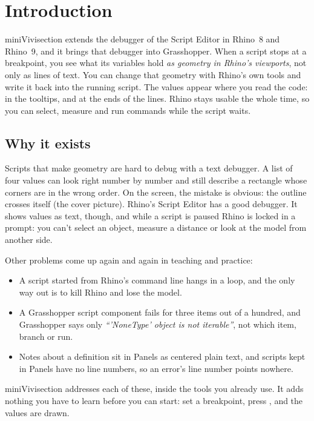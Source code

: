 \chapter{Introduction}\label{ch:intro}

miniVivisection extends the debugger of the Script Editor in Rhino~8 and Rhino~9, and it brings that debugger into
Grasshopper. When a script stops at a breakpoint, you see what its variables hold \emph{as geometry in
Rhino's viewports}, not only as lines of text. You can change that geometry with Rhino's own tools and
write it back into the running script. The values appear where you read the code: in the tooltips, and
at the ends of the lines. Rhino stays usable the whole time, so you can select, measure and run commands
while the script waits.

\section{Why it exists}

Scripts that make geometry are hard to debug with a text debugger. A list of four
 values can look right number by number and still describe a rectangle whose corners
are in the wrong order. On the screen, the mistake is obvious: the outline crosses itself
(the cover picture). Rhino's Script Editor has a good debugger. It shows values as text, though, and
while a script is paused Rhino is locked in a  prompt: you can't select an object,
measure a distance or look at the model from another side.

Other problems come up again and again in teaching and practice:
\begin{itemize}
  \item A script started from Rhino's command line hangs in a loop, and the only way out is to kill
        Rhino and lose the model.
  \item A Grasshopper script component fails for three items out of a hundred, and Grasshopper says
        only \emph{“'NoneType' object is not iterable”}, not which item, branch or run.
  \item Notes about a definition sit in Panels as centered plain text, and scripts kept in Panels have
        no line numbers, so an error's line number points nowhere.
\end{itemize}

miniVivisection addresses each of these, inside the tools you already use. It adds nothing you have to
learn before you can start: set a breakpoint, press , and the values are drawn.

